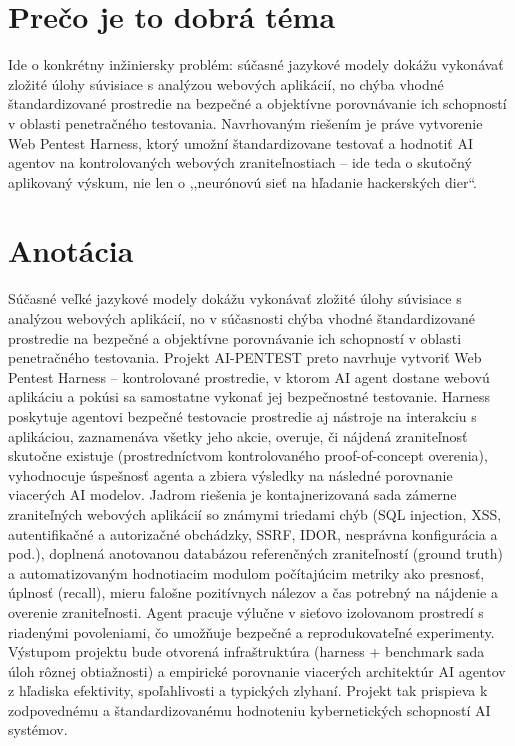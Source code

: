 \documentclass[11pt,a4paper]{article}
\begin{document}
\section*{Prečo je to dobrá téma}

\noindent
Ide o konkrétny inžiniersky problém: súčasné jazykové modely dokážu vykonávať zložité úlohy súvisiace s analýzou webových aplikácií, no chýba vhodné štandardizované prostredie na bezpečné a objektívne porovnávanie ich schopností v oblasti penetračného testovania. Navrhovaným riešením je práve vytvorenie Web Pentest Harness, ktorý umožní štandardizovane testovať a hodnotiť AI agentov na kontrolovaných webových zraniteľnostiach -- ide teda o skutočný aplikovaný výskum, nie len o ,,neurónovú sieť na hľadanie hackerských dier``.

\section*{Anotácia}

\noindent
Súčasné veľké jazykové modely dokážu vykonávať zložité úlohy súvisiace s analýzou webových aplikácií, no v súčasnosti chýba vhodné štandardizované prostredie na bezpečné a objektívne porovnávanie ich schopností v oblasti penetračného testovania. Projekt AI-PENTEST preto navrhuje vytvoriť Web Pentest Harness -- kontrolované prostredie, v ktorom AI agent dostane webovú aplikáciu a pokúsi sa samostatne vykonať jej bezpečnostné testovanie. Harness poskytuje agentovi bezpečné testovacie prostredie aj nástroje na interakciu s aplikáciou, zaznamenáva všetky jeho akcie, overuje, či nájdená zraniteľnosť skutočne existuje (prostredníctvom kontrolovaného proof-of-concept overenia), vyhodnocuje úspešnosť agenta a zbiera výsledky na následné porovnanie viacerých AI modelov. Jadrom riešenia je kontajnerizovaná sada zámerne zraniteľných webových aplikácií so známymi triedami chýb (SQL injection, XSS, autentifikačné a autorizačné obchádzky, SSRF, IDOR, nesprávna konfigurácia a pod.), doplnená anotovanou databázou referenčných zraniteľností (ground truth) a automatizovaným hodnotiacim modulom počítajúcim metriky ako presnosť, úplnosť (recall), mieru falošne pozitívnych nálezov a čas potrebný na nájdenie a overenie zraniteľnosti. Agent pracuje výlučne v sieťovo izolovanom prostredí s riadenými povoleniami, čo umožňuje bezpečné a reprodukovateľné experimenty. Výstupom projektu bude otvorená infraštruktúra (harness + benchmark sada úloh rôznej obtiažnosti) a empirické porovnanie viacerých architektúr AI agentov z hľadiska efektivity, spoľahlivosti a typických zlyhaní. Projekt tak prispieva k zodpovednému a štandardizovanému hodnoteniu kybernetických schopností AI systémov.
\end{document}
